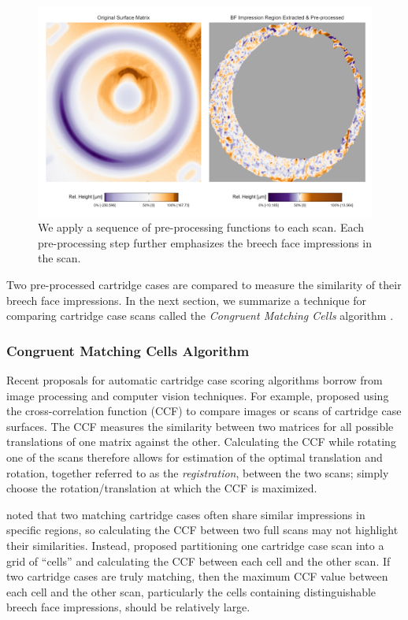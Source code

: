 \documentclass[reprint]{JASA}
\begin{document}
\begin{figure}[htbp]
\includegraphics[width=.5\textwidth]{figures/preProcessEffect} \caption{\label{fig:preProcessEffect} We apply a sequence of pre-processing functions to each scan. Each pre-processing step further emphasizes the breech face impressions in the scan.}\label{fig:unnamed-chunk-1}
\end{figure}

Two pre-processed cartridge cases are compared to measure the similarity
of their breech face impressions. In the next section, we summarize a
technique for comparing cartridge case scans called the \emph{Congruent
Matching Cells} algorithm \citep{song_proposed_2013}.

\hypertarget{congruent-matching-cells-algorithm}{%
\subsubsection{Congruent Matching Cells
Algorithm}\label{congruent-matching-cells-algorithm}}

Recent proposals for automatic cartridge case scoring algorithms borrow
from image processing and computer vision techniques. For example,
\citet{vorburger_surface_2007} proposed using the cross-correlation
function (CCF) to compare images or scans of cartridge case surfaces.
The CCF measures the similarity between two matrices for all possible
translations of one matrix against the other. Calculating the CCF while
rotating one of the scans therefore allows for estimation of the optimal
translation and rotation, together referred to as the
\emph{registration}, between the two scans; simply choose the
rotation/translation at which the CCF is maximized.

\citet{song_proposed_2013} noted that two matching cartridge cases often
share similar impressions in specific regions, so calculating the CCF
between two full scans may not highlight their similarities. Instead,
\citet{song_proposed_2013} proposed partitioning one cartridge case scan
into a grid of ``cells'' and calculating the CCF between each cell and
the other scan. If two cartridge cases are truly matching, then the
maximum CCF value between each cell and the other scan, particularly the
cells containing distinguishable breech face impressions, should be
relatively large.
\end{document}
